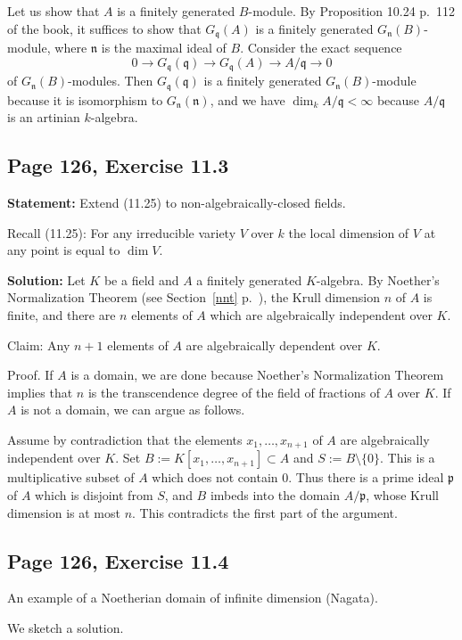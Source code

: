 \documentclass[parskip=half,fontsize=12pt]{scrartcl}%
\newcommand{\mf}{\mathfrak}
\newcommand{\nnn}{\mf n}
\newcommand{\ppp}{\mf p}
\newcommand{\qqq}{\mf q}
\begin{document}
Let us show that $A$ is a finitely generated $B$-module. By Proposition 10.24 p.~112 of the book, it suffices to show that $G_\qqq(A)$ is a finitely generated $G_\nnn(B)$-module, where $\nnn$ is the maximal ideal of $B$. Consider the exact sequence 
$$
0\to G_\qqq(\qqq)\to G_\qqq(A)\to A/\qqq\to0
$$ 
of $G_\nnn(B)$-modules. Then $G_\qqq(\qqq)$ is a finitely generated $G_\nnn(B)$-module because it is isomorphism to $G_\nnn(\nnn)$, and we have $\dim_kA/\qqq<\infty$ because $A/\qqq$ is an artinian $k$-algebra. 

\subsection{Page 126, Exercise 11.3}%

\textbf{Statement:} Extend (11.25) to non-algebraically-closed fields.

Recall (11.25): For any irreducible variety $V$ over $k$ the local dimension of $V$ at any point is equal to $\dim V$.

\textbf{Solution:} Let $K$ be a field and $A$ a finitely generated $K$-algebra. By Noether's Normalization Theorem (see Section~\ref{nnt} p.~\pageref{nnt}), the Krull dimension $n$ of $A$ is finite, and there are $n$ elements of $A$ which are algebraically independent over $K$. 

Claim: Any $n+1$ elements of $A$ are algebraically dependent over $K$.

Proof. If $A$ is a domain, we are done because Noether's Normalization Theorem implies that $n$ is the transcendence degree of the field of fractions of $A$ over $K$. If $A$ is not a domain, we can argue as follows. 

Assume by contradiction that the elements $x_1,\ldots,x_{n+1}$ of $A$ are algebraically independent over $K$. Set $B:=K[x_1,\ldots,x_{n+1}]\subset A$ and $S:=B\setminus\{0\}$. This is a multiplicative subset of $A$ which does not contain $0$. Thus there is a prime ideal $\ppp$ of $A$ which is disjoint from $S$, and $B$ imbeds into the domain $A/\ppp$, whose Krull dimension is at most $n$. This contradicts the first part of the argument. 

\subsection{Page 126, Exercise 11.4}%

An example of a Noetherian domain of infinite dimension (Nagata).

We sketch a solution. 
\end{document}
